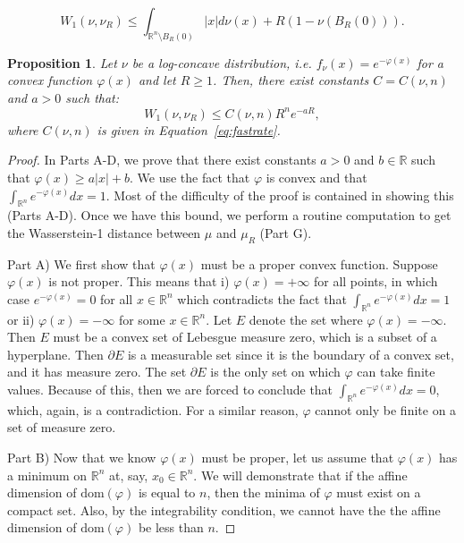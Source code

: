\documentclass[10pt,a4paper]{amsart}
\newtheorem{proposition}{Proposition}
\begin{document}
\begin{equation}
W_1(\nu, \nu_R) \leq \int_{\mathbb{R}^n \setminus B_{R}(0)} \vert x \vert d\nu(x) + R(1-\nu(B_{R}(0))).
\end{equation}

\begin{proposition}\label{prop:logconcave}
Let $\nu$ be a log-concave distribution, i.e. $f_{\nu}(x) = e^{-\varphi(x)}$ for a convex function $\varphi(x)$ and let $R \geq 1$. Then, there exist constants $C = C(\nu, n)$ and $a>0$ such that:
\begin{equation}
W_1(\nu, \nu_{R}) \leq C(\nu, n) R^n e^{-aR},
\end{equation}
where $C(\nu, n)$ is given in Equation~\eqref{eq:fastrate}.
\end{proposition}

\begin{proof}
In Parts A-D, we prove that there exist constants $a>0$ and $b \in \mathbb{R}$ such that $\varphi(x) \geq a \vert x \vert + b$. We use the fact that $\varphi$ is convex and that $\int_{\mathbb{R}^n} e^{-\varphi(x)}dx = 1$. Most of the difficulty of the proof is contained in showing this (Parts A-D). Once we have this bound, we perform a routine computation to get the Wasserstein-1 distance between $\mu$ and $\mu_{R}$ (Part G).

Part A) We first show that $\varphi(x)$ must be a proper convex function. Suppose $\varphi(x)$ is not proper. This means that i) $\varphi(x) = +\infty$ for all points, in which case $e^{-\varphi(x)} = 0$ for all $x\in \mathbb{R}^n$ which contradicts the fact that $\int_{\mathbb{R}^n} e^{-\varphi(x)}dx = 1$ or ii) $\varphi(x) = -\infty$ for some $x \in \mathbb{R}^n$. Let $E$ denote the set where $\varphi(x) = -\infty$. Then $E$ must be a convex set of Lebesgue measure zero, which is a subset of a hyperplane. Then $\partial E$ is a measurable set since it is the boundary of a convex set, and it has measure zero. The set $\partial E$ is the only set on which $\varphi$ can take finite values. Because of this, then we are forced to conclude that $\int_{\mathbb{R}^n} e^{-\varphi(x)}dx = 0$, which, again, is a contradiction. For a similar reason, $\varphi$ cannot only be finite on a set of measure zero.

Part B) Now that we know $\varphi(x)$ must be proper, let us assume that $\varphi(x)$ has a minimum on $\mathbb{R}^n$ at, say, $x_0 \in \mathbb{R}^n$. We will demonstrate that if the affine dimension of $\text{dom}(\varphi)$ is equal to $n$, then the minima of $\varphi$ must exist on a compact set. Also, by the integrability condition, we cannot have the the affine dimension of $\text{dom}(\varphi)$ be less than $n$.


\end{proof}
\end{document}
